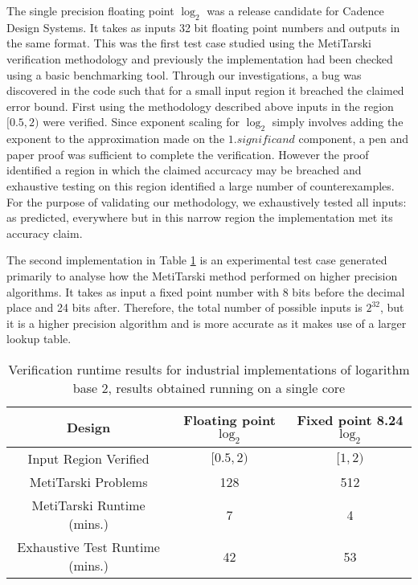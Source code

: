 \documentclass[a4]{article}
\begin{document}
The single precision floating point $\log_2$ was a release candidate for Cadence Design Systems. It takes as inputs 32 bit floating point numbers and outputs in the same format. This was the first test case studied using the MetiTarski verification methodology and previously the implementation had been checked using a basic benchmarking tool. Through our investigations, a bug was discovered in the code such that for a small input region it breached the claimed error bound. First using the methodology described above inputs in the region $[0.5,2)$ were verified. Since exponent scaling for $\log_2$ simply involves adding the exponent to the approximation made on the $1.\textit{significand}$ component, a pen and paper proof was sufficient to complete the verification. However the proof identified a region in which the  claimed accurcacy may be breached and exhaustive testing on this region identified a large number of counterexamples. For the purpose of validating our methodology, we exhaustively tested all inputs: as predicted, everywhere but in this narrow region the implementation met its accuracy claim.

The second implementation in Table \ref{result} is an experimental test case generated primarily to analyse how the MetiTarski method performed on higher precision algorithms. It takes as input a fixed point number with 8 bits before the decimal place and 24 bits after. Therefore, the total number of possible inputs is $2^{32}$, but it is a higher precision algorithm and is more accurate as it makes use of a larger lookup table.

\begin{center}
\begin{table}[h!]
\centering
\begin{tabular}{ccc} 
\toprule
 Design & Floating point $\log_2$ & Fixed point 8.24 $\log_2$    \\
\midrule
 Input Region Verified& $[0.5,2)$ & $[1,2) $ \\ 
 MetiTarski Problems & 128 & 512 \\
 MetiTarski Runtime (mins.) &  7 & 4 \\ 
 Exhaustive Test Runtime (mins.) & 42 & 53 \\ 
\bottomrule
\end{tabular}
\caption{Verification runtime results for industrial implementations of logarithm base 2, results obtained running on a single core}
\label{result}
\end{table}
\end{center}
\end{document}

